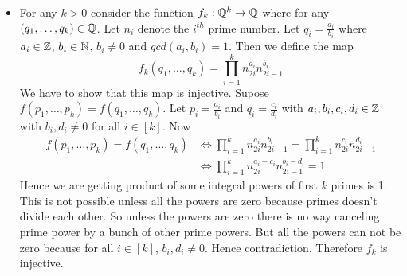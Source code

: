 \documentclass[a4paper, 11pt]{article}
\begin{document}
{\begin{itemize}
%	
	
	
	
	
		
		\item For any $k>0$ consider the function $f_k:\mathbb{Q}^k\to \mathbb{Q}$ where for any $(q_1,\dots, q_k)\in\mathbb{Q}$. Let $n_i$ denote the $i^{th}$ prime number. Let $q_i=\frac{a_i}{b_i}$ where $a_i\in\mathbb{Z}$, $b_i\in\mathbb{N}$, $b_i\neq 0$ and $gcd(a_i,b_i)=1$. Then we define the map $$f_k(q_1,\dots, q_k)=\prod_{i=1}^k n_{2i}^{a_i}n_{2i-1}^{b_i}$$We have to show that this map is injective. Supose $f(p_1,\dots,p_k)=f(q_1,\dots, q_k)$. Let $p_i=\frac{a_i}{b_i}$ and $q_i=\frac{c_i}{d_i} $ with $a_i,b_i,c_i,d_i\in\mathbb{Z}$ with $b_i,d_i\neq 0$ for all $i\in[k]$. Now \begin{align*}
			f(p_1,\dots,p_k)=f(q_1,\dots, q_k) & \iff \prod_{i=1}^k n_{2i}^{a_i}n_{2i-1}^{b_i}=\prod_{i=1}^k n_{2i}^{c_i}n_{2i-1}^{d_i}\\
			& \iff \prod_{i=1}^k n_{2i}^{a_i-c_i}n_{2i-1}^{b_i-d_i}=1
		\end{align*}Hence we are getting product of some integral powers of first $k$ primes is 1. This is not possible unless all the powers are zero because primes doesn't divide each other. So unless the powers are zero there is no way canceling prime power by a bunch of other prime powers. But all the powers can not be zero because for all $i\in[k]$, $b_i,d_i\neq 0$. Hence contradiction. Therefore $f_k$ is injective. 
	\vspace*{2mm}
	

\end{itemize}}
\end{document}
